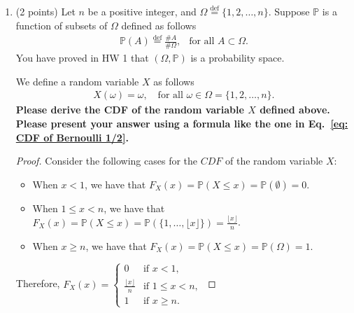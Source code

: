 \documentclass[11pt]{article}
\newcommand{\p}{\mathbb{P}}
\begin{document}
\begin{enumerate}
\begin{enumerate}
\begin{proof}
    Now, we can use this relation to show that $\mathbb{P}(A|B) + \mathbb{P}(A^c| B) = 1$.
    \begin{align*}
        \p(A\,|\,B) &= \frac{\p(A\cap B)}{\p(B)} & \text{(conditional probability)}\\
        &= \frac{\p(B)-\p(A^c\cap B)}{\p(B)} & \text{(substitute from above)}\\
        &= \frac{\p(B)}{\p(B)}-\frac{\p(A^c\cap B)}{\p(B)} & \text{(distributive prop.)}\\
        &= 1 - \p(A^c\,|\,B) & \text{(conditional probability)}
    \end{align*}
\end{proof}
\end{enumerate}

\item (2 points) Let $n$ be a positive integer, and $\Omega \overset{\operatorname{def}}{=}\{1,2,\ldots,n\}$. Suppose $\mathbb{P}$ is a function of subsets of $\Omega$ defined as follows
\begin{align*}
\mathbb{P}(A)\overset{\operatorname{def}}{=}\frac{\# A}{\#\Omega}, \ \ \text{ for all }A\subset \Omega.
\end{align*}
You have proved in HW 1 that $(\Omega,\mathbb{P})$ is a probability space. 

We define a random variable $X$ as follows
\begin{align*}
    X(\omega)=\omega,\ \ \ \text{ for all }\omega\in\Omega=\{1,2,\ldots,n\}.
\end{align*}
\textbf{Please derive the CDF of the random variable $X$ defined above. Please present your answer using a formula like the one in Eq.~\eqref{eq: CDF of Bernoulli 1/2}.}

\begin{proof} Consider the following cases for the \(CDF\) of the random variable \(X\):
    \begin{itemize}
        \item When \(x<1\), we have that \(F_X(x)=\p(X\leq x)=\p(\emptyset)=0\).
        \item When \(1\leq x<n\), we have that \(F_X(x)=\p(X\leq x)=\p(\{1,\ldots,\lfloor x\rfloor\})=\frac{\lfloor x\rfloor}{n}\).
        \item When \(x\geq n\), we have that \(F_X(x)=\p(X\leq x)=\p(\Omega)=1\).
    \end{itemize}
    Therefore, \(F_X(x)=
    \begin{cases}
        0 & \text{if } x<1,\\
        \frac{\lfloor x\rfloor}{n} & \text{if } 1\leq x<n,\\
        1 & \text{if } x\geq n.
    \end{cases}\)
\end{proof}


\end{enumerate}
\end{document}
